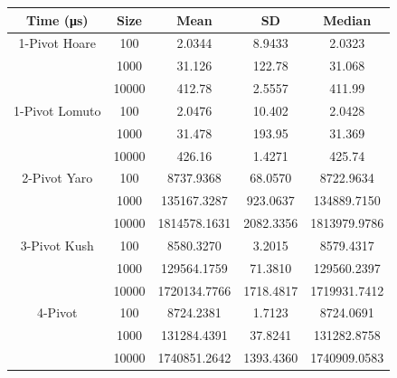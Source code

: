 \documentclass{article}
\begin{document}
\begin{center}
    \begin{tabular}{ |c c | c c c| }
        \hline
        Time (μs)       & Size     & Mean         & SD          & Median \\
        \hline
        1-Pivot Hoare   & 100      & 2.0344       & 8.9433      & 2.0323 \\
                        & 1000     & 31.126       & 122.78      & 31.068 \\
                        & 10000    & 412.78       & 2.5557      & 411.99 \\
        \hline
        1-Pivot Lomuto  & 100      & 2.0476       & 10.402      & 2.0428 \\
                        & 1000     & 31.478       & 193.95      & 31.369 \\
                        & 10000    & 426.16       & 1.4271      & 425.74 \\
        \hline
        2-Pivot Yaro    & 100      & 8737.9368    & 68.0570     & 8722.9634 \\
                        & 1000     & 135167.3287  &	923.0637    & 134889.7150 \\
                        & 10000    & 1814578.1631 & 2082.3356   & 1813979.9786 \\
        \hline
        3-Pivot Kush    & 100      & 8580.3270    & 3.2015      & 8579.4317 \\
                        & 1000     & 129564.1759  &	71.3810     & 129560.2397 \\
                        & 10000    & 1720134.7766 & 1718.4817   & 1719931.7412 \\
        \hline
        4-Pivot         & 100      & 8724.2381    &	1.7123      & 8724.0691 \\
                        & 1000     & 131284.4391  &	37.8241     & 131282.8758 \\
                        & 10000    & 1740851.2642 & 1393.4360   & 1740909.0583 \\
        \hline
    \end{tabular}
\end{center}
\end{document}
